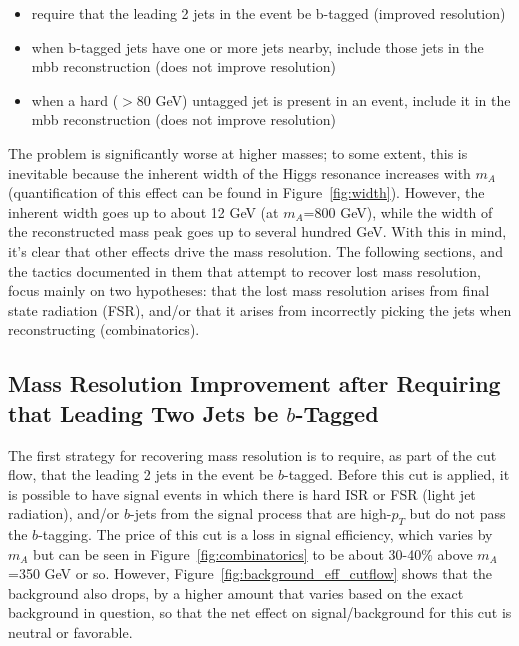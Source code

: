 \begin{itemize}
    \item require that the leading 2 jets in the event be b-tagged (improved resolution)
    \item when b-tagged jets have one or more jets nearby, include those jets in the mbb reconstruction (does
not improve resolution)
    \item when a hard ($>$80 GeV) untagged jet is present in an event, include it in the mbb reconstruction
(does not improve resolution)
\end{itemize}


The problem is significantly worse at higher masses;
to some extent, this is inevitable because the inherent width of the Higgs resonance increases with $m_A$
(quantification of this effect can be found in Figure~\ref{fig:width}). However, the inherent width goes up to about 12
GeV (at $m_A$=800 GeV), while the width of the reconstructed mass peak goes up to several hundred GeV.
With this in mind, it’s clear that other effects drive the mass resolution.  The following sections, 
and the tactics documented in them that attempt to recover lost mass resolution, focus mainly 
on two hypotheses: that the lost mass resolution arises from final state radiation (FSR), and/or
that it arises from incorrectly picking the jets when reconstructing (combinatorics). 




\subsection{Mass Resolution Improvement after Requiring that Leading Two Jets be $b$-Tagged}
The first strategy for recovering mass resolution is to require, as part of the cut flow,
that the leading 2 jets in the event be $b$-tagged.  Before this cut is applied, it is
possible to have signal events in which there is hard ISR or FSR (light jet radiation),
and/or $b$-jets from the signal process that are high-$p_T$ but do not pass the $b$-tagging.
The price of this cut is a loss in signal efficiency, which varies by $m_A$ but can be 
seen in Figure~\ref{fig:combinatorics} to be about 30-40\% above $m_A$=350 GeV or so.
However, Figure~\ref{fig:background_eff_cutflow} shows that the background also drops, 
by a higher amount that varies based on the exact background in question, so that the net 
effect on signal/background for this cut is neutral or favorable.
 

